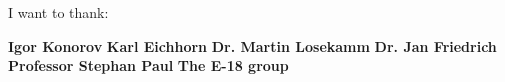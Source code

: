\thispagestyle{empty}
\vspace*{2cm}
I want to thank:

\medskip
\noindent
\textbf{Igor Konorov} 
\newline
\textbf{Karl Eichhorn} 
\newline
\textbf{Dr. Martin Losekamm}
\newline
\textbf{Dr. Jan Friedrich}
\newline
\textbf{Professor Stephan Paul}
\newline
\textbf{The E-18 group}
\newline

